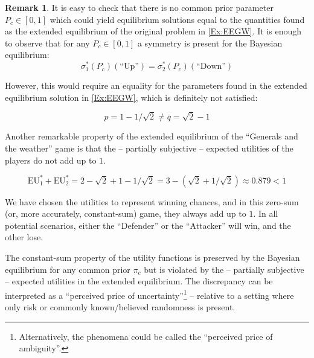 \documentclass{article}
\theoremstyle{definition}
\newtheorem*{remark}{Remark}
\begin{document}
\begin{remark}
    It is easy to check that there is no common prior parameter $P_c \in [0,1]$ which could yield equilibrium solutions equal to the quantities found as the extended equilibrium of the original problem in \ref{Ex:EEGW}.
    It is enough to observe that for any $P_c \in [0,1]$ a symmetry is present for the Bayesian equilibrium:
    \begin{equation}
        \sigma^*_1(P_c) (\text{``Up''}) = \sigma^*_2(P_c) (\text{``Down''})
    \end{equation}

    However, this would require an equality for the parameters found in the extended equilibrium solution in \ref{Ex:EEGW}, which is definitely not satisfied:

    \begin{equation}
        p = 1-1/\sqrt{2} \ne \bar{q} = \sqrt{2} - 1
    \end{equation}

    Another remarkable property of the extended equilibrium of the ``Generals and the weather'' game is that the -- partially subjective -- expected utilities of the players do not add up to $1$.

    \begin{equation}
        \mathrm{EU}_1^* + \mathrm{EU}_2^* = 2 - \sqrt{2} + 1 - 1/\sqrt{2}
        = 3 - \left ( \sqrt{2} + 1/\sqrt{2} \right ) 
        \approx 0.879
        < 1
    \end{equation}

    We have chosen the utilities to represent winning chances, and in this zero-sum (or, more accurately, constant-sum) game, they always add up to $1$. In all potential scenarios, either the ``Defender'' or the ``Attacker'' will win, and the other lose.

    The constant-sum property of the utility functions is preserved by the Bayesian equilibrium for any common prior $\pi_c$ but is violated by the -- partially subjective -- expected utilities in the extended equilibrium.
    The discrepancy can be interpreted as a ``perceived price of uncertainty''\footnote{Alternatively, the phenomena could be called the ``perceived price of ambiguity''.} -- relative to a setting where only risk or commonly known/believed randomness is present. 

    \end{remark}
\end{document}
